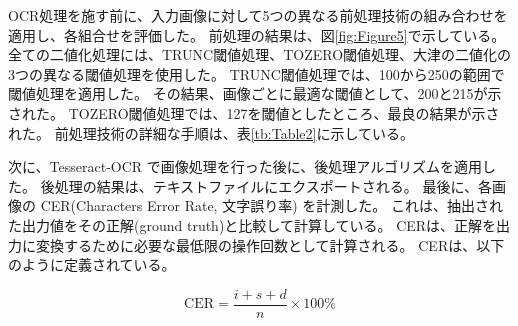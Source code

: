 \documentclass[uplatex, twocolumn,10pt]{jsarticle}
\begin{document}
\begin{table}[htbp]
\begin{tabular}{|l|l|}
        \hline
    \end{tabular}
\end{table}

OCR処理を施す前に、入力画像に対して5つの異なる前処理技術の組み合わせを適用し、各組合せを評価した。
前処理の結果は、図\ref{fig:Figure5}で示している。
全ての二値化処理には、TRUNC閾値処理、TOZERO閾値処理、大津の二値化の3つの異なる閾値処理を使用した。
TRUNC閾値処理では、100から250の範囲で閾値処理を適用した。
その結果、画像ごとに最適な閾値として、200と215が示された。
TOZERO閾値処理では、127を閾値としたところ、最良の結果が示された。
前処理技術の詳細な手順は、表\ref{tb:Table2}に示している。

次に、Tesseract-OCR で画像処理を行った後に、後処理アルゴリズムを適用した。
後処理の結果は、テキストファイルにエクスポートされる。
最後に、各画像の CER(Characters Error Rate, 文字誤り率) を計測した。
これは、抽出された出力値をその正解(ground truth)と比較して計算している。
CERは、正解を出力に変換するために必要な最低限の操作回数として計算される。
CERは、以下のように定義されている。

\begin{equation}
    \text{CER} =
    \frac{i + s + d}{n} \times 100 \%
\end{equation}
\end{document}
